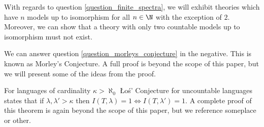 With regards to question \ref{question_finite_spectra}, we will exhibit theories which have \(n\) models up to isomorphism for all \(n \in \N\) with the exception of \(2\).
Moreover, we can show that a theory with only two countable models up to isomorphism must not exist. 


We can answer question \ref{question_morleys_conjecture} in the negative. This is known as Morley's Conjecture. A full proof is beyond the scope of this paper, but we will present some of the ideas from the proof. 

For languages of cardinality \(\kappa > \aleph_0\) \L o\'s' Conjecture for uncountable languages states that if \(\lambda, \lambda' >\kappa\) then \(I(T, \lambda) = 1 \iff I(T, \lambda') = 1\). 
A complete proof of this theorem is again beyond the scope of this paper, but we reference {\color{red}someplace or other.} %

